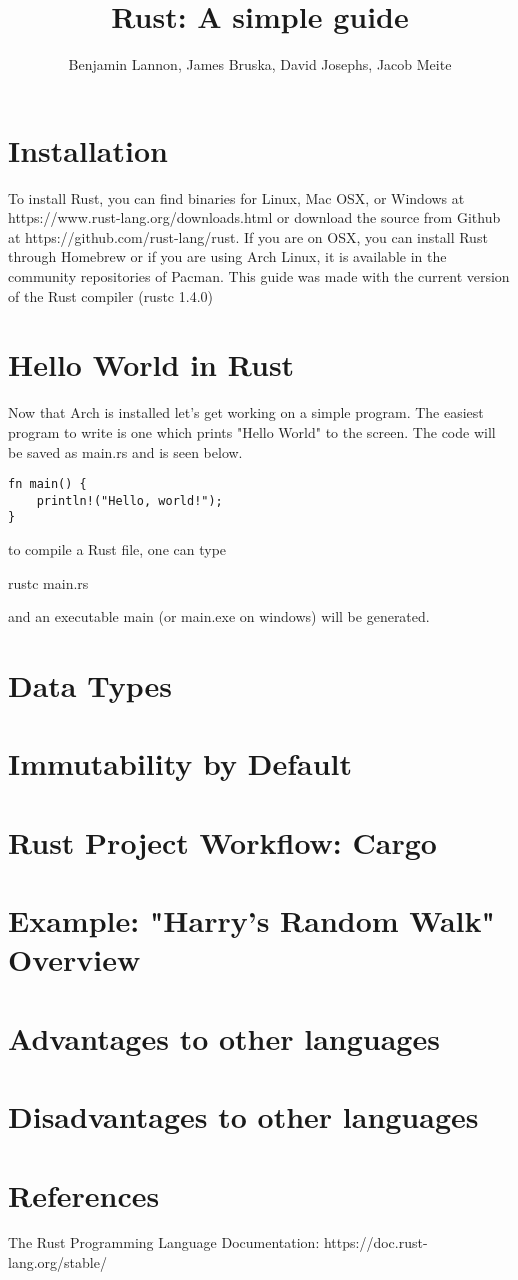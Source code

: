 \documentclass{article}
\title{Rust: A simple guide}
\author{Benjamin Lannon, James Bruska, David Josephs, Jacob Meite}
\begin{document}
\maketitle
\tableofcontents

\section{Installation}
To install Rust, you can find binaries for Linux, Mac OSX, or Windows at https://www.rust-lang.org/downloads.html or download the source from Github at https://github.com/rust-lang/rust. If you are on OSX, you can install Rust through Homebrew or if you are using Arch Linux, it is available in the community repositories of Pacman. This guide was made with the current version of the Rust compiler (rustc 1.4.0)

\section{Hello World in Rust}
Now that Arch is installed let's get working on a simple program. The easiest program to write is one which prints "Hello World" to the screen. The code will be saved as main.rs and is seen below.
\begin{lstlisting}
fn main() {
	println!("Hello, world!");
}
\end{lstlisting}

to compile a Rust file, one can type \begin{small}
rustc main.rs
\end{small}
and an executable main (or main.exe on windows) will be generated.

\section{Data Types}

\section{Immutability by Default}

\section{Rust Project Workflow: Cargo}

\section{Example: "Harry's Random Walk" Overview}

\section{Advantages to other languages}

\section{Disadvantages to other languages}

\section{References}
The Rust Programming Language Documentation: https://doc.rust-lang.org/stable/
\end{document}
